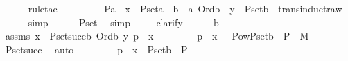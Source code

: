 \begin{isabellebody}
\ \ \ \ \isamarkupfalse%
\ {\isacharparenleft}{\kern0pt}rule{\isacharunderscore}{\kern0pt}tac\ \isanewline
\ \ \ \ \ \ \ \ P{\isacharequal}{\kern0pt}{\isachardoublequoteopen}{\isasymlambda}a\ {\isachardot}{\kern0pt}\ {\isacharparenleft}{\kern0pt}x\ {\isasymin}\ P{\isacharunderscore}{\kern0pt}set{\isacharparenleft}{\kern0pt}a{\isacharparenright}{\kern0pt}\ {\isasymlongrightarrow}\ {\isacharparenleft}{\kern0pt}{\isasymexists}b\ {\isacharless}{\kern0pt}\ a{\isachardot}{\kern0pt}\ Ord{\isacharparenleft}{\kern0pt}b{\isacharparenright}{\kern0pt}\ {\isasymand}\ y\ {\isasymin}\ P{\isacharunderscore}{\kern0pt}set{\isacharparenleft}{\kern0pt}b{\isacharparenright}{\kern0pt}{\isacharparenright}{\kern0pt}{\isacharparenright}{\kern0pt}{\isachardoublequoteclose}\ \ trans{\isacharunderscore}{\kern0pt}induct{}{\isacharunderscore}{\kern0pt}raw{\isacharparenright}{\kern0pt}\isanewline
\ \ \ \ \isamarkupfalse%
\ simp\isanewline
\ \ \ \ \isamarkupfalse%
\ P{\isacharunderscore}{\kern0pt}set{\isacharunderscore}{\kern0pt}{}\ \isamarkupfalse%
\ simp\ \isanewline
\ \ \isamarkupfalse%
\ {\isacharparenleft}{\kern0pt}clarify{\isacharparenright}{\kern0pt}\isanewline
\ \ \ \ \isamarkupfalse%
\ b\isanewline
\ \ \ \ \isamarkupfalse%
\ assms\ {\isacharcolon}{\kern0pt}{\isachardoublequoteopen}x\ {\isasymin}\ P{\isacharunderscore}{\kern0pt}set{\isacharparenleft}{\kern0pt}succ{\isacharparenleft}{\kern0pt}b{\isacharparenright}{\kern0pt}{\isacharparenright}{\kern0pt}{\isachardoublequoteclose}\ {\isachardoublequoteopen}Ord{\isacharparenleft}{\kern0pt}b{\isacharparenright}{\kern0pt}{\isachardoublequoteclose}\ {\isachardoublequoteopen}{\isasymlangle}y{\isacharcomma}{\kern0pt}\ p{\isasymrangle}\ {\isasymin}\ x\ {\isachardoublequoteclose}\isanewline
\ \ \ \ \isamarkupfalse%
\ \isamarkupfalse%
\ p{}\ {\isacharcolon}{\kern0pt}\ {\isachardoublequoteopen}x\ {\isasymin}\ \ Pow{\isacharparenleft}{\kern0pt}P{\isacharunderscore}{\kern0pt}set{\isacharparenleft}{\kern0pt}b{\isacharparenright}{\kern0pt}\ {\isasymtimes}\ P{\isacharparenright}{\kern0pt}\ {\isasyminter}\ M{\isachardoublequoteclose}\ \isamarkupfalse%
\ P{\isacharunderscore}{\kern0pt}set{\isacharunderscore}{\kern0pt}succ\ \isamarkupfalse%
\ auto\ \isanewline
\ \ \ \ \isamarkupfalse%
\ \isamarkupfalse%
\ p{}\ {\isacharcolon}{\kern0pt}\ {\isachardoublequoteopen}x\ {\isasymsubseteq}\ P{\isacharunderscore}{\kern0pt}set{\isacharparenleft}{\kern0pt}b{\isacharparenright}{\kern0pt}\ {\isasymtimes}\ P{\isachardoublequoteclose}\ \isamarkupfalse%

\end{isabellebody}
